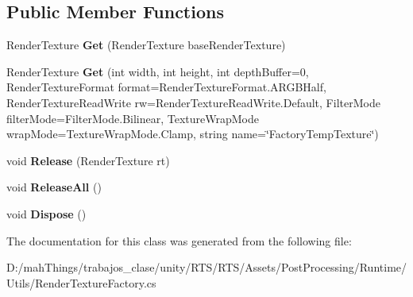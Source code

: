 \subsection*{Public Member Functions}
\begin{DoxyCompactItemize}
\item 
\mbox{\label{class_unity_engine_1_1_post_processing_1_1_render_texture_factory_a66f2ee62b9248b0d50c8c4792b893cbd}} 
Render\+Texture {\bfseries Get} (Render\+Texture base\+Render\+Texture)
\item 
\mbox{\label{class_unity_engine_1_1_post_processing_1_1_render_texture_factory_aaf1c6deb2c4bdc1cc30f9c22243f5ab8}} 
Render\+Texture {\bfseries Get} (int width, int height, int depth\+Buffer=0, Render\+Texture\+Format format=Render\+Texture\+Format.\+A\+R\+G\+B\+Half, Render\+Texture\+Read\+Write rw=Render\+Texture\+Read\+Write.\+Default, Filter\+Mode filter\+Mode=Filter\+Mode.\+Bilinear, Texture\+Wrap\+Mode wrap\+Mode=Texture\+Wrap\+Mode.\+Clamp, string name=\char`\"{}Factory\+Temp\+Texture\char`\"{})
\item 
\mbox{\label{class_unity_engine_1_1_post_processing_1_1_render_texture_factory_a056c901a6186ae99274acbbd099ee76a}} 
void {\bfseries Release} (Render\+Texture rt)
\item 
\mbox{\label{class_unity_engine_1_1_post_processing_1_1_render_texture_factory_a6f5d4a6beda0674159c229f8b3a9a116}} 
void {\bfseries Release\+All} ()
\item 
\mbox{\label{class_unity_engine_1_1_post_processing_1_1_render_texture_factory_aff8e64c17598aa2633a075e3975b0efc}} 
void {\bfseries Dispose} ()
\end{DoxyCompactItemize}


The documentation for this class was generated from the following file\+:\begin{DoxyCompactItemize}
\item 
D\+:/mah\+Things/trabajos\+\_\+clase/unity/\+R\+T\+S/\+R\+T\+S/\+Assets/\+Post\+Processing/\+Runtime/\+Utils/Render\+Texture\+Factory.\+cs\end{DoxyCompactItemize}
